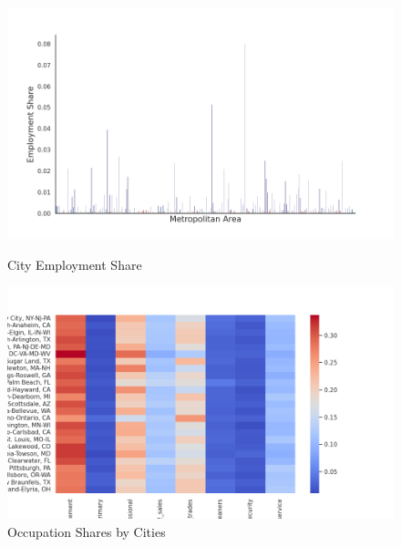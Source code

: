 \documentclass[10pt]{article}
\begin{document}

\begin{figure}[!htb]
    \centering
    \begin{minipage}{0.48\textwidth}
        \centering
        \includegraphics[width=\textwidth]{../../estimations/graphs/city_employment_share.png}
        \caption{City Employment Share}
        \label{employment_city_share}
    \end{minipage}\hfill
    \begin{minipage}{0.48\textwidth}
        \centering
        \includegraphics[width=\textwidth]{../../estimations/graphs/top_25_city_heatmap.png}
        \caption{Occupation Shares by Cities}
        \label{top_25_city_heatmap}
    \end{minipage}
\end{figure}
\end{document}
